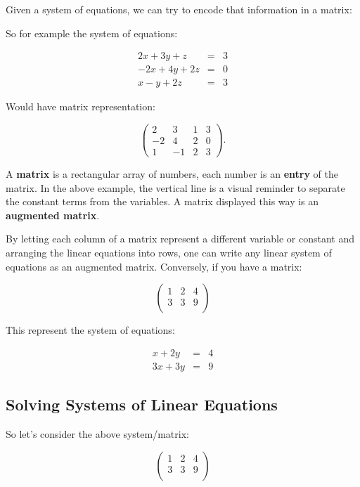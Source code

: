 Given a system of equations, we can try to encode that information in a matrix:

So for example the system of equations:

\begin{eqnarray*}
2x+3y+z&=&3\\
-2x+4y+2z&=&0\\
x-y+2z&=&3
\end{eqnarray*}

Would have matrix representation:

$$ \left( \begin{array}{rrr|r}
2 & 3 & 1& 3\\
-2 & 4 & 2 & 0\\
1 & -1 & 2 & 3
\end{array}\right).$$

A \textbf{matrix} is a rectangular array of numbers, each number is an \textbf{entry} of the matrix.  In the above example, the vertical line is a visual reminder to separate the constant terms from the variables.  A matrix displayed this way is an \textbf{augmented matrix}.

By letting each column of a matrix represent a different variable or constant and arranging the linear equations into rows, one can write any linear system of equations as an augmented matrix.   Conversely, if you have a matrix:

$$ \left( \begin{array}{rr|r}
1 & 2 & 4\\
3 & 3  & 9\\
\end{array}\right)$$

This represent the system of equations:


\begin{eqnarray*}
x+2y&=&4\\
3x+3y&=&9
\end{eqnarray*}

\subsection{Solving Systems of Linear Equations}

So let's consider the above system/matrix:

$$ \left( \begin{array}{rr|r}
1 & 2 & 4\\
3 & 3  & 9\\
\end{array}\right)$$



